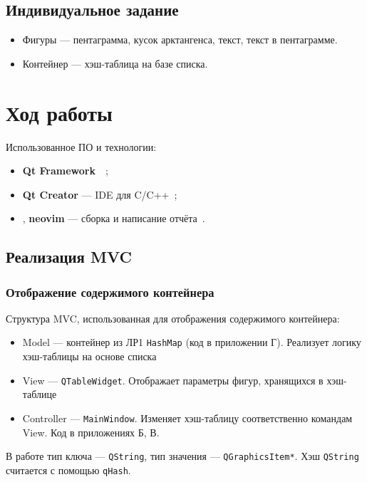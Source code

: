 \documentclass[a4paper, 14pt]{extarticle}
\begin{document}
\subsection{Индивидуальное задание}
\begin{itemize}
    \item Фигуры --- пентаграмма, кусок арктангенса, текст, текст в пентаграмме.
    \item Контейнер --- хэш-таблица на базе списка.
\end{itemize}

\section{Ход работы}
Использованное ПО и технологии:
\begin{itemize}
    \item \textbf{Qt Framework}~\cite{shlee}~\cite{qt5};
    \item \textbf{Qt Creator} --- IDE для C/C++~\cite{qtcreator};
    \item \XeLaTeX{}, \textbf{neovim} --- сборка и написание отчёта~\cite{latex}.
\end{itemize}

\subsection{Реализация MVC}
\subsubsection{Отображение содержимого контейнера}
Структура MVC, использованная для отображения содержимого контейнера:
\begin{itemize}
    \item Model --- контейнер из ЛР1 \texttt{HashMap} (код  в приложении Г). Реализует логику хэш-таблицы на основе списка
    \item View --- \texttt{QTableWidget}. Отображает параметры фигур, хранящихся в хэш-таблице
    \item Controller --- \texttt{MainWindow}. Изменяет хэш-таблицу соответственно командам View. Код в приложениях Б, В.
\end{itemize}

В работе тип ключа --- \texttt{QString}, тип значения --- \texttt{QGraphicsItem*}. Хэш \texttt{QString} считается с помощью \texttt{qHash}.
\end{document}
